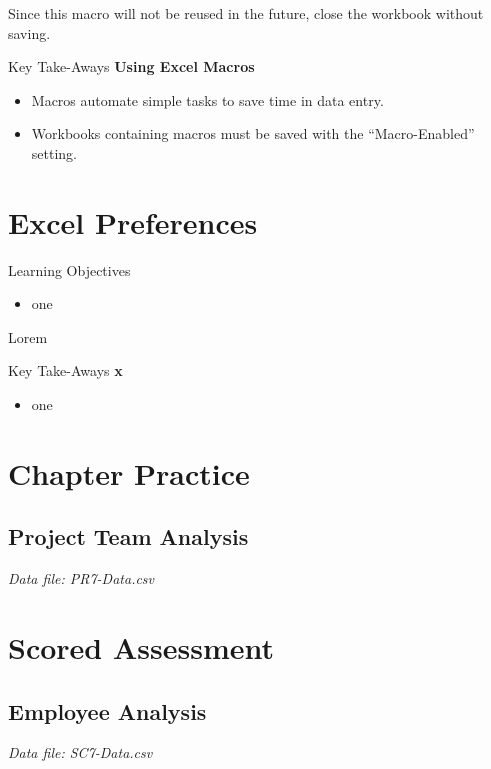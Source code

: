 Since this macro will not be reused in the future, close the workbook without saving.

\begin{center}
	\begin{tkwbox}{Key Take-Aways}
		\textbf{Using Excel Macros}
		\\
		\begin{itemize}
			\setlength{\itemsep}{0pt}
			\setlength{\parskip}{0pt}
			\setlength{\parsep}{0pt}
			
			\item Macros automate simple tasks to save time in data entry.
			\item Workbooks containing macros must be saved with the ``Macro-Enabled'' setting.
			
		\end{itemize}
	\end{tkwbox}
\end{center}

\section{Excel Preferences}

\begin{center}
	\begin{objbox}{Learning Objectives}
		\begin{itemize}
			\setlength{\itemsep}{0pt}
			\setlength{\parskip}{0pt}
			\setlength{\parsep}{0pt}
			
			\item one
			
		\end{itemize}
	\end{objbox}
\end{center}

Lorem

\begin{center}
	\begin{tkwbox}{Key Take-Aways}
		\textbf{x}
		\\
		\begin{itemize}
			\setlength{\itemsep}{0pt}
			\setlength{\parskip}{0pt}
			\setlength{\parsep}{0pt}
			
			\item one
			
		\end{itemize}
	\end{tkwbox}
\end{center}



\section{Chapter Practice}

\subsection{Project Team Analysis}

\textit{Data file: PR7-Data.csv}


\section{Scored Assessment}

\subsection{Employee Analysis}

\textit{Data file: SC7-Data.csv}

